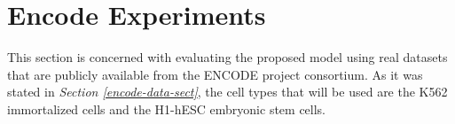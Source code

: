 \section{Encode Experiments} \label{meth-encode-experiments-sect}
This section is concerned with evaluating the proposed model using real datasets that are publicly available from the ENCODE project consortium. As it was stated in \emph{Section \ref{encode-data-sect}}, the cell types that will be used are the K562 immortalized cells and the H1-hESC embryonic stem cells. 




